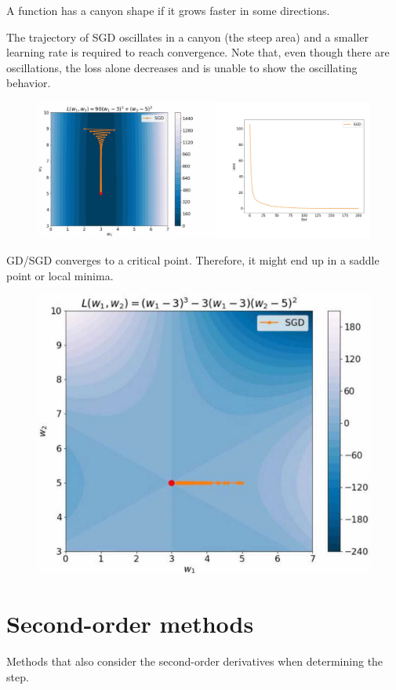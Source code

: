 \begin{remark}[Canyons] 
    A function has a canyon shape if it grows faster in some directions.

    The trajectory of SGD oscillates in a canyon (the steep area) and a smaller learning rate is required to reach convergence. Note that, even though there are oscillations, the loss alone decreases and is unable to show the oscillating behavior.

    \begin{figure}[H]
        \centering
        \includegraphics[width=0.8\linewidth]{./img/sgd_canyon.jpg}
    \end{figure}
\end{remark}

\begin{remark} 
    GD/SGD converges to a critical point. Therefore, it might end up in a saddle point or local minima.

    \begin{figure}[H]
        \centering
        \includegraphics[width=0.35\linewidth]{./img/sgd_local_minima.jpg}
    \end{figure}
\end{remark}



\section{Second-order methods}

Methods that also consider the second-order derivatives when determining the step.


